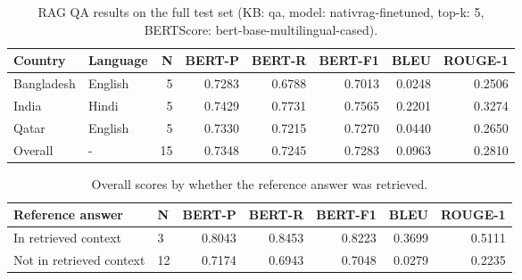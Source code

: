\begin{table}[t]
\centering
\begin{tabular}{llrrrrrr}
\hline
Country & Language & N & BERT-P & BERT-R & BERT-F1 & BLEU & ROUGE-1 \\
\hline
Bangladesh & English & 5 & 0.7283 & 0.6788 & 0.7013 & 0.0248 & 0.2506 \\
India & Hindi & 5 & 0.7429 & 0.7731 & 0.7565 & 0.2201 & 0.3274 \\
Qatar & English & 5 & 0.7330 & 0.7215 & 0.7270 & 0.0440 & 0.2650 \\
Overall & - & 15 & 0.7348 & 0.7245 & 0.7283 & 0.0963 & 0.2810 \\
\hline
\end{tabular}
\caption{RAG QA results on the full test set (KB: qa, model: nativrag-finetuned, top-k: 5, BERTScore: bert-base-multilingual-cased).}
\label{tab:results}
\end{table}

\begin{table}[t]
\centering
\begin{tabular}{llrrrrr}
\hline
Reference answer & N & BERT-P & BERT-R & BERT-F1 & BLEU & ROUGE-1 \\
\hline
In retrieved context & 3 & 0.8043 & 0.8453 & 0.8223 & 0.3699 & 0.5111 \\
Not in retrieved context & 12 & 0.7174 & 0.6943 & 0.7048 & 0.0279 & 0.2235 \\
\hline
\end{tabular}
\caption{Overall scores by whether the reference answer was retrieved.}
\label{tab:results-context}
\end{table}
